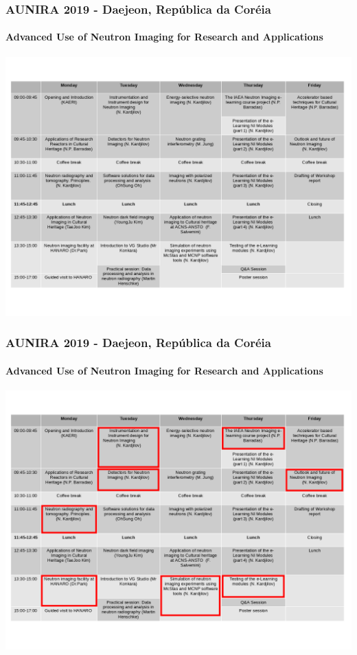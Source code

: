 \documentclass[svgnames,smaller,table]{beamer}
\begin{document}
\begin{frame}
  \frametitle{AUNIRA 2019 - Daejeon, República da Coréia}
  \framesubtitle{Advanced Use of Neutron Imaging for Research and Applications}
  \begin{center}
    \includegraphics[scale=2.0]{figures/agenda.png}
    \end{center}
\end{frame}

\begin{frame}
  \frametitle{AUNIRA 2019 - Daejeon, República da Coréia}
  \framesubtitle{Advanced Use of Neutron Imaging for Research and Applications}
  \begin{center}
    \includegraphics[scale=2.0]{figures/agenda-marked.png}
    \end{center}
\end{frame}
\end{document}
